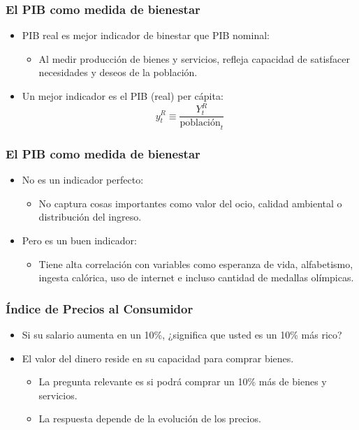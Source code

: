 \documentclass[dvipsnames,table,leqno]{beamer}
\newcommand{\peq}[1]{{\scriptscriptstyle{#1}}}
\begin{document}
		\begin{frame}
			\frametitle{El PIB como medida de bienestar}
			\begin{itemize}
				\item PIB real es mejor indicador de binestar que PIB nominal:
					\begin{itemize}
						\item Al medir producción de bienes y servicios, refleja capacidad de satisfacer necesidades y deseos de la población.
					\end{itemize}
				\item Un mejor indicador es el PIB (real) per cápita: $$y^\peq{R}_\peq{t}\equiv\frac{Y^\peq{R}_\peq{t}}{\text{población}_\peq{t}}$$ 
			\end{itemize}
		\end{frame}	
		
		\begin{frame}
			\frametitle{El PIB como medida de bienestar}
			\begin{itemize}
				\item No es un indicador perfecto:
					\begin{itemize}
						\item No captura cosas importantes como valor del ocio, calidad ambiental o distribución del ingreso.
					\end{itemize}
				\item Pero es un buen indicador:
					\begin{itemize}
						\item Tiene alta correlación con variables como esperanza de vida, alfabetismo, ingesta calórica, uso de internet e incluso cantidad de medallas olímpicas.
					\end{itemize}
			\end{itemize}
		\end{frame}			

		\begin{frame}
			\frametitle{Índice de Precios al Consumidor}
			\begin{itemize}
				\item Si su salario aumenta en un 10\%, ¿significa que usted es un 10\% más rico?
				\item El valor del dinero reside en su capacidad para comprar bienes.
					\begin{itemize}
						\item La pregunta relevante es si podrá comprar un 10\% más de bienes y servicios.
						\item La respuesta depende de la evolución de los precios.
					\end{itemize}
			\end{itemize}
		\end{frame}			
\end{document}
